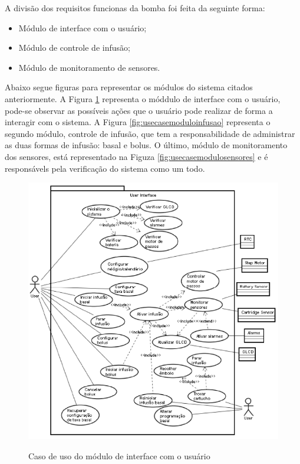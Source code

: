 A divisão dos requisitos funcionas da bomba foi feita da seguinte forma:
\begin{itemize}
\item Módulo de interface com o usuário;
\item Módulo de controle de infusão;
\item Módulo de monitoramento de sensores.
\end{itemize}

Abaixo segue figuras para representar os módulos do sistema citados anteriormente. A Figura \ref{fig:usecaseinterfaceusuario} representa o móddulo de interface com o usuário, pode-se observar as possíveis ações que o usuário pode realizar de forma a interagir com o sistema. A Figura \ref{fig:usecasemoduloinfusao} representa o segundo módulo, controle de infusão, que tem a responsabilidade de administrar as duas formas de infusão: basal e bolus. O último, módulo de monitoramento dos sensores, está representado na Figuza \ref{fig:usecasemodulosensores} e é responsávels pela verificação do sistema como um todo.

\begin{figure}[htp]
	\centering
	\includegraphics[scale=0.8]{images/caso_uso_interface_usuario.png}
	\caption{Caso de uso do módulo de interface com o usuário}	
	\label{fig:usecaseinterfaceusuario}
	\cite{galvao2013requirements}
\end{figure}

